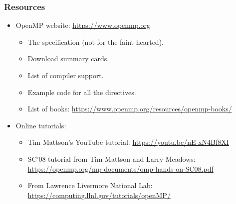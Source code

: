 \documentclass{beamer}
\begin{document}
\begin{frame}
\frametitle{Resources}
\begin{itemize}
\item OpenMP website: \url{https://www.openmp.org}
  \begin{itemize}
    \item The specification (not for the faint hearted).
    \item Download summary cards.
    \item List of compiler support.
    \item Example code for all the directives.
    \item List of books: \url{https://www.openmp.org/resources/openmp-books/}
  \end{itemize}

\item Online tutorials:
  \begin{itemize}
    \item Tim Mattson's YouTube tutorial: \url{https://youtu.be/nE-xN4Bf8XI}
    \item SC'08 tutorial from Tim Mattson and Larry Meadows: \url{https://openmp.org/mp-documents/omp-hands-on-SC08.pdf}
    \item From Lawrence Livermore National Lab: \url{https://computing.llnl.gov/tutorials/openMP/}
  \end{itemize}

\end{itemize}

\end{frame}

\end{document}
